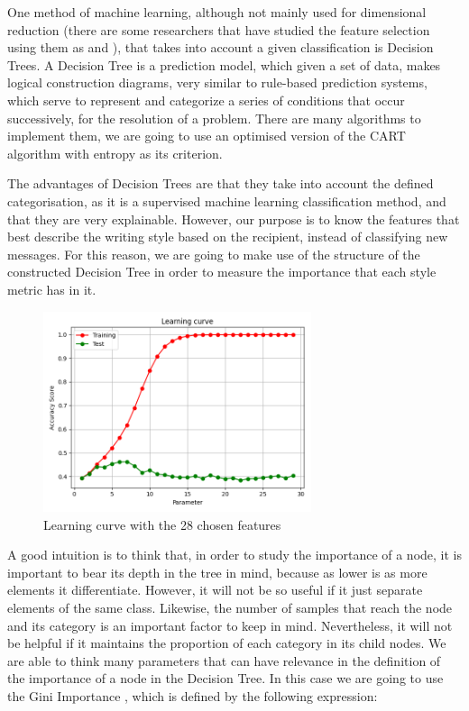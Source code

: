 One method of machine learning, although not mainly used for dimensional reduction (there are some researchers that have studied the feature selection using them as \cite{sugumaran2007feature} and \cite{cho2011decision}), that takes into account a given classification is Decision Trees. A Decision Tree \citep{rokach2008data} is a prediction model, which given a set of data, makes logical construction diagrams, very similar to rule-based prediction systems, which serve to represent and categorize a series of conditions that occur successively, for the resolution of a problem. There are many algorithms to implement them, we are going to use an optimised version of the CART algorithm \citep{breiman1984classification} with entropy as its criterion.

The advantages of Decision Trees are that they take into account the defined categorisation, as it is a supervised machine learning classification method, and that they are very explainable. However, our purpose is to know the features that best describe the writing style based on the recipient, instead of classifying new messages. For this reason, we are going to make use of the structure of the constructed Decision Tree in order to measure the importance that each style metric has in it.

\begin{figure}
	\centering%
	\centerline{\includegraphics[width=0.7\textwidth]{Imagenes/Bitmap/DecisionTrees/learning28curve.png}}%
	\caption{Learning curve with the 28 chosen features}%
	\label{fig:learn28curve}
\end{figure}

A good intuition is to think that, in order to study the importance of a node, it is important to bear its depth in the tree in mind, because as lower is as more elements it differentiate. However, it will not be so useful if it just separate elements of the same class. Likewise, the number of samples that reach the node and its category is an important factor to keep in mind. Nevertheless, it will not be helpful if it maintains the proportion of each category in its child nodes. We are able to think many parameters that can have relevance in the definition of the importance of a node in the Decision Tree. In this case we are going to use the Gini Importance \citep{breiman2001random}, which is defined by the following expression:

